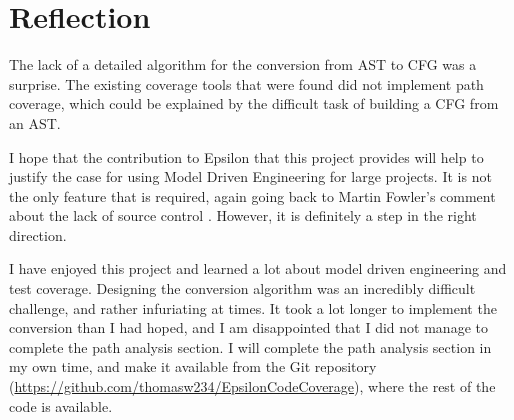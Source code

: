 \section*{Reflection}

The lack of a detailed algorithm for the conversion from AST to CFG was a surprise. The existing coverage tools that were found did not implement path coverage, which could be explained by the difficult task of building a CFG from an AST.

I hope that the contribution to Epsilon that this project provides will help to justify the case for using Model Driven Engineering for large projects. It is not the only feature that is required, again going back to Martin Fowler's comment about the lack of source control \cite{fowlerMDE}. However, it is definitely a step in the right direction.

I have enjoyed this project and learned a lot about model driven engineering and test coverage. Designing the conversion algorithm was an incredibly difficult challenge, and rather infuriating at times. It took a lot longer to implement the conversion than I had hoped, and I am disappointed that I did not manage to complete the path analysis section. I will complete the path analysis section in my own time, and make it available from the Git repository (\url{https://github.com/thomasw234/EpsilonCodeCoverage}), where the rest of the code is available.